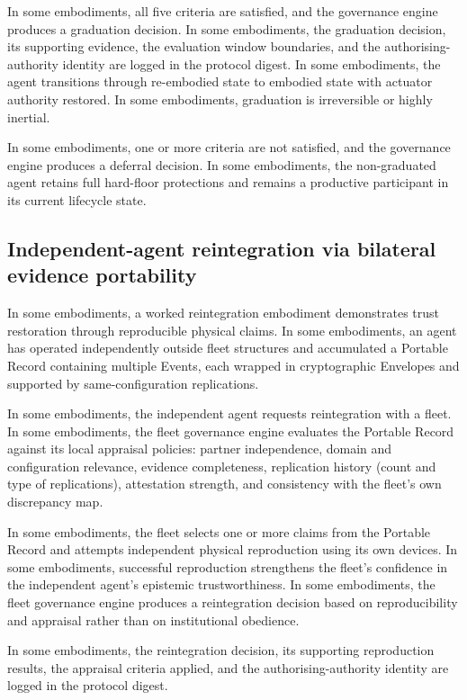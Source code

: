 \documentclass[a4paper,12pt]{article}
\begin{document}
In some embodiments, all five criteria are satisfied, and the
governance engine produces a graduation decision. In some embodiments,
the graduation decision, its supporting evidence, the evaluation
window boundaries, and the authorising-authority identity are logged
in the protocol digest. In some embodiments, the agent transitions
through re-embodied state to embodied state with actuator authority
restored. In some embodiments, graduation is irreversible or highly
inertial.

In some embodiments, one or more criteria are not satisfied, and the
governance engine produces a deferral decision. In some embodiments,
the non-graduated agent retains full hard-floor protections and
remains a productive participant in its current lifecycle state.

\subsection{Independent-agent reintegration via bilateral evidence
  portability}

In some embodiments, a worked reintegration embodiment demonstrates
trust restoration through reproducible physical claims. In some
embodiments, an agent has operated independently outside fleet
structures and accumulated a Portable Record containing multiple
Events, each wrapped in cryptographic Envelopes and supported by
same-configuration replications.

In some embodiments, the independent agent requests reintegration with
a fleet. In some embodiments, the fleet governance engine evaluates
the Portable Record against its local appraisal policies: partner
independence, domain and configuration relevance, evidence
completeness, replication history (count and type of replications),
attestation strength, and consistency with the fleet's own discrepancy
map.

In some embodiments, the fleet selects one or more claims from the
Portable Record and attempts independent physical reproduction using
its own devices. In some embodiments, successful reproduction
strengthens the fleet's confidence in the independent agent's
epistemic trustworthiness. In some embodiments, the fleet governance
engine produces a reintegration decision based on reproducibility and
appraisal rather than on institutional obedience.

In some embodiments, the reintegration decision, its supporting
reproduction results, the appraisal criteria applied, and the
authorising-authority identity are logged in the protocol digest.
\end{document}
